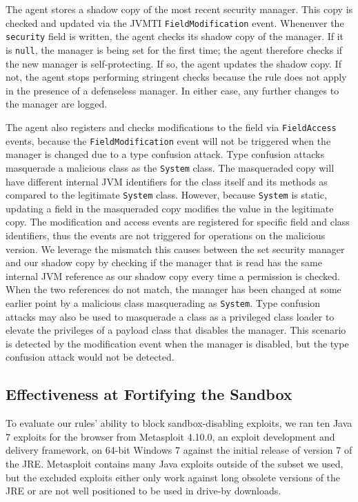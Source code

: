 \documentclass{sig-alternate}
\begin{document}
The agent stores a shadow copy of the most recent security
manager. This copy is checked and updated via the JVMTI \texttt{FieldModification} event.
Whenenver the \texttt{security} field is written, the agent checks its
shadow copy of the manager.  If it is \texttt{null},
the manager is being set for the first time; the agent therefore checks
if the new manager is self-protecting. If so, 
the agent updates the shadow copy. If not, the agent stops performing stringent checks because the rule does not apply in the presence of a defenseless
manager. In either case, any further changes to the manager are logged.

The agent also registers and checks modifications to the field via
\texttt{FieldAccess} events, 
because the \texttt{FieldModification} event will not be triggered
when the manager is changed due to a type confusion attack.  Type confusion attacks
masquerade a malicious class as the
\texttt{System} class.  The masqueraded copy will have different internal
JVM identifiers for the class itself and its methods as compared to the legitimate
\texttt{System} class. However, because \texttt{System} is static, updating a
field in the masqueraded copy modifies the value in the legitimate copy. 
The
modification and access events are registered for specific field and
class identifiers, thus the events are not triggered for operations
on the malicious version. We leverage the mismatch this causes between
the set security manager and our shadow copy by checking if
the manager that is read has the same internal
JVM reference as our shadow copy every time a permission is checked. When the two references do not match,
the manager has been changed at some earlier point by a malicious class masquerading as
\texttt{System}. Type confusion attacks may also be used to masquerade
a class as a privileged class loader to elevate the privileges of
a payload class that disables the manager. This scenario is detected
by the modification event when the manager is disabled, but the type confusion attack would not be detected.


\subsection{Effectiveness at Fortifying the Sandbox}\label{sub:Effectiveness-at-Fortifying}


To evaluate our rules' ability to 
block sandbox-disabling exploits, 
we ran ten Java 7 exploits for the browser from Metasploit 4.10.0, an exploit development and delivery framework, on 64-bit
Windows 7 against the initial release of version 7 of the JRE.
Metasploit contains many Java exploits
outside of the subset we used, but the excluded exploits either only
work against long obsolete versions of the JRE or are not well positioned
to be used in drive-by downloads. 
\end{document}
